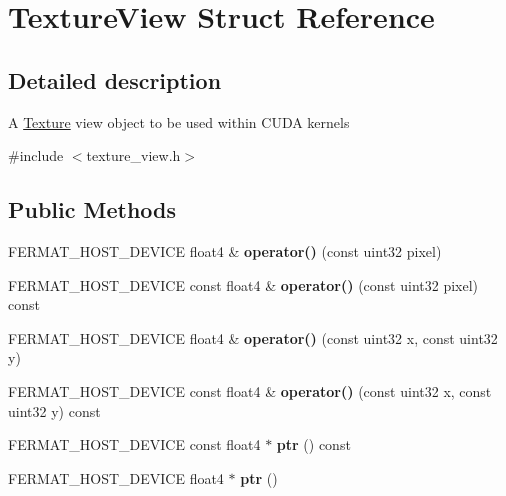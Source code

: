 \hypertarget{struct_texture_view}{}\section{Texture\+View Struct Reference}
\label{struct_texture_view}


\subsection{Detailed description}
A \hyperlink{struct_texture_storage_TextureStorage}{Texture} view object to be used within C\+U\+DA kernels 

{\ttfamily \#include $<$texture\+\_\+view.\+h$>$}

\subsection*{Public Methods}
\begin{DoxyCompactItemize}
\item 
\mbox{\label{struct_texture_view_ab7664895dfdec8c87228ea9df5154cd9}} 
F\+E\+R\+M\+A\+T\+\_\+\+H\+O\+S\+T\+\_\+\+D\+E\+V\+I\+CE float4 \& {\bfseries operator()} (const uint32 pixel)
\item 
\mbox{\label{struct_texture_view_a37775cc3d6696ecfcaf784bc9c077b97}} 
F\+E\+R\+M\+A\+T\+\_\+\+H\+O\+S\+T\+\_\+\+D\+E\+V\+I\+CE const float4 \& {\bfseries operator()} (const uint32 pixel) const
\item 
\mbox{\label{struct_texture_view_a30273033767f3a8184179b721dde18d0}} 
F\+E\+R\+M\+A\+T\+\_\+\+H\+O\+S\+T\+\_\+\+D\+E\+V\+I\+CE float4 \& {\bfseries operator()} (const uint32 x, const uint32 y)
\item 
\mbox{\label{struct_texture_view_ac4329b13ca8da22b63220415542ba8fd}} 
F\+E\+R\+M\+A\+T\+\_\+\+H\+O\+S\+T\+\_\+\+D\+E\+V\+I\+CE const float4 \& {\bfseries operator()} (const uint32 x, const uint32 y) const
\item 
\mbox{\label{struct_texture_view_afddfd9ac358fdaa725d193147ed9c926}} 
F\+E\+R\+M\+A\+T\+\_\+\+H\+O\+S\+T\+\_\+\+D\+E\+V\+I\+CE const float4 $\ast$ {\bfseries ptr} () const
\item 
\mbox{\label{struct_texture_view_ac9b5f3aaf46d442ebb7493a2d693c858}} 
F\+E\+R\+M\+A\+T\+\_\+\+H\+O\+S\+T\+\_\+\+D\+E\+V\+I\+CE float4 $\ast$ {\bfseries ptr} ()
\end{DoxyCompactItemize}
